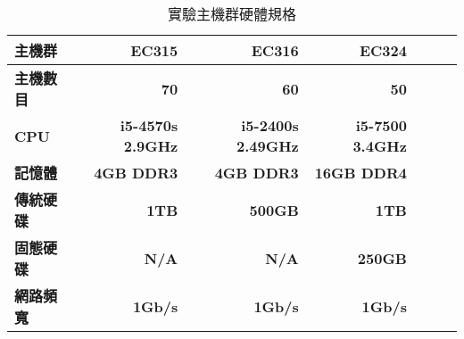 \begin{table}[!htbp]
\centering
\caption{實驗主機群硬體規格}
\label{pcspec}
\begin{adjustbox}{max width=0.92\textwidth}
\begin{tabular}{lrrrrrr}

\toprule
\multicolumn{1}{l}{\textbf{主機群}} & \textbf{EC315} & \textbf{EC316} & \textbf{EC324} \\ \midrule
\multicolumn{1}{l}{\textbf{主機數目}} & \textbf{70} & \textbf{60} & \textbf{50} \\

\multicolumn{1}{l}{\textbf{CPU}} & \textbf{i5-4570s 2.9GHz} & \textbf{i5-2400s 2.49GHz} & \textbf{i5-7500 3.4GHz} \\

\multicolumn{1}{l}{\textbf{記憶體}} & \textbf{4GB DDR3} & \textbf{4GB DDR3} & \textbf{16GB DDR4} \\

\multicolumn{1}{l}{\textbf{傳統硬碟}} & \textbf{1TB} & \textbf{500GB} & \textbf{1TB} \\

\multicolumn{1}{l}{\textbf{固態硬碟}} & \textbf{N/A} & \textbf{N/A} & \textbf{250GB} \\

\multicolumn{1}{l}{\textbf{網路頻寬}} & \textbf{1Gb/s} & \textbf{1Gb/s} & \textbf{1Gb/s} \\
\bottomrule
\end{tabular}
\end{adjustbox}
\end{table}
